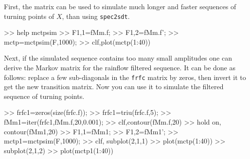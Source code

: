 First, the matrix can be used to simulate much longer and faster
sequences of turning points of $X$, than using \verb|spec2sdt|.
\begin{code}
>> help mctpsim
>> F{1,1}=fMm.f;
>> F{1,2}=fMm.f';
>> mctp=mctpsim(F,1000);
>> clf,plot(mctp(1:40))
\end{code}
Next, if the simulated sequence contains too many small amplitudes one can
derive the Markov matrix for the rainflow filtered sequence. It can be done as
follows: replace a few sub-diagonals in the \verb|frfc| matrix by zeros,
then invert  it to get the new transition matrix. Now you can
use it to simulate the filtered sequence of turning points.
\begin{code}
>> frfc1=zeros(size(frfc.f));
>> frfc1=triu(frfc.f,5);
>> fMm1=iter(frfc1,fMm.f,20,0.001);
>> clf,contour(fMm.f,20)
>> hold on,  contour(fMm1,20)
>> F{1,1}=fMm1;
>> F{1,2}=fMm1';
>> mctp1=mctpsim(F,1000);
>> clf, subplot(2,1,1)
>> plot(mctp(1:40))
>> subplot(2,1,2)
>> plot(mctp1(1:40))
\end{code}
